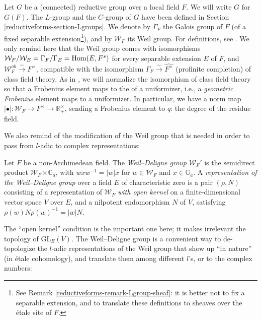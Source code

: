 Let $G$ be a (connected) reductive group over a local field $F$. We will write $G$ for $G(F)$. The $L$-group and the $C$-group of $G$ have been defined in Section \ref{reductiveforms-section-Lgroups}. We denote by $\Gamma_F$ the Galois group of $F$ (of a fixed separable extension\footnote{See Remark \ref{reductiveforms-remark-Lgroup-sheaf}: it is better not to fix a separable extension, and to translate these definitions to sheaves over the \'etale site of $F$.}), and by $\mathcal W_F$ its Weil group. For definitions, see \cite{Tate-Corvallis}. We only remind here that the Weil group comes with isomorphisms $\mathcal W_F/\mathcal W_E = \Gamma_F/\Gamma_E = \mathop{\rm Hom}\nolimits(E,F^s)$ for every separable extension $E$ of $F$, and $\mathcal W_F^{ab}\xrightarrow\sim F^\times$, compatible with the isomorphism $\Gamma_F \xrightarrow\sim \widehat{F^\times}$ (profinite completion) of class field theory. As in \cite{Tate-Corvallis}, we will normalize the isomorphism of class field theory so that a Frobenius element maps to the  of a uniformizer, i.e., a \emph{geometric Frobenius} element maps to a uniformizer. In particular, we have a norm map $|\bullet|: \mathcal W_F \to  F^\times \to \mathbb R_+^\times$, sending a Frobenius element to $q$: the degree of the residue field.

We also remind of the modification of the Weil group that is needed in order to pass from $l$-adic to complex representations:

\begin{definition}
 \label{definition-Weil-Deligne}
Let $F$ be a non-Archimedean field. The {\it Weil--Deligne group} $\mathcal W_F'$ is the semidirect product $\mathcal W_F\ltimes \mathbb G_a$, with $w x w^{-1} = |w| x$ for $w\in \mathcal W_F$ and $x\in \mathbb G_a$. A {\it representation of the Weil--Deligne group} over a field $E$ of characteristic zero is a pair $(\rho, N)$ consisting of a representation of $\mathcal W_F$ \emph{with open kernel} on a finite-dimensional vector space $V$ over $E$, and a nilpotent endomorphism $N$ of $V$, satisfying $\rho(w)N\rho(w)^{-1} = |w|\dot N$. 
\end{definition}

The ``open kernel'' condition is the important one here; it makes irrelevant the topology of $\text{GL}_E(V)$. The Weil--Deligne group is a convenient way to de-topologize the $l$-adic representations of the Weil group that show up ``in nature'' (in \'etale cohomology), and translate them among different $l$'s, or to the complex numbers:


